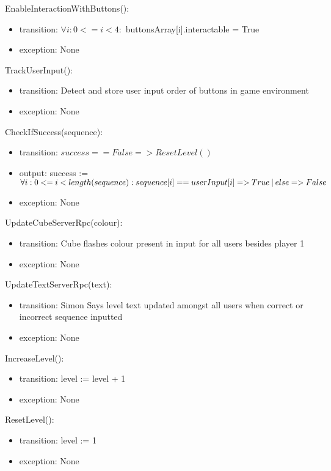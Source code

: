 \documentclass[12pt, titlepage]{article}
\begin{document}
\noindent EnableInteractionWithButtons():
\begin{itemize}
\item transition: $ \forall i: 0 <= i < 4 :$ \newline buttonsArray[i].interactable = True
\item exception: None
\end{itemize}

\noindent TrackUserInput():
\begin{itemize}
\item transition: Detect and store user input order of buttons in game environment
\item exception: None
\end{itemize}

\noindent CheckIfSuccess(sequence):
\begin{itemize}
\item transition: $success == False => ResetLevel()$
\item output: success := $ \forall i: 0 <= i < length(sequence) : \newline sequence[i] == userInput[i] => True  \: | \: else => False$
\item exception: None
\end{itemize}

\noindent UpdateCubeServerRpc(colour):
\begin{itemize}
\item transition: Cube flashes colour present in input for all users besides player 1
\item exception: None
\end{itemize}

\noindent UpdateTextServerRpc(text):
\begin{itemize}
\item transition: Simon Says level text updated amongst all users when correct or incorrect sequence inputted
\item exception: None
\end{itemize}

\noindent IncreaseLevel():
\begin{itemize}
\item transition: level := level + 1
\item exception: None
\end{itemize}

\noindent ResetLevel():
\begin{itemize}
\item transition: level := 1
\item exception: None
\end{itemize}
\end{document}
